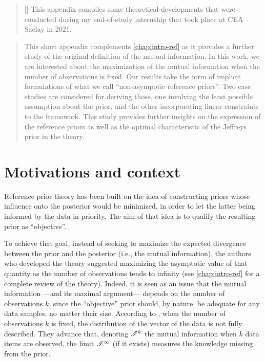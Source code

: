 

\begin{abstract}[\hspace*{-10pt}]
    This appendix compiles some theoretical developments that were conducted during my end-of-study internship that took place at CEA Saclay in 2021. %
\end{abstract}


\begin{abstract}
    This short appendix complements \cref{chap:intro-ref} as it provides a further study of the original definition of the mutual information.
    In this work, we are interested about the maximization of the mutual information when the number of observations is fixed. Our results take 
    the form of implicit formulations of  what we call ``non-asympotic reference priors''. 
    Two case studies are considered for deriving those, 
    one involving the least possible assumption about the prior, and the other incorporating linear constraints to the framework.
    This study provides further insights on the expression of the reference priors as well as the optimal characteristic of the Jeffreys prior in the theory.
\end{abstract}


\minitoc

\section{Motivations and context}

Reference prior theory has been built on the idea of constructing  priors whose influence onto the posterior would be minimized, in order to let the latter being informed by the data in priority.
The aim of that idea is to qualify the resulting prior as ``objective''.

To achieve that goal, 
instead of seeking to maximize the expected divergence between the prior and the posterior (i.e., the mutual information), 
the authors who developed the theory \citep{bernardo_reference_1979,bernardo_bayesian_1994} suggested maximizing the asymptotic value of that quantity as the number of observations tends to infinity (see \cref{chap:intro-ref} for a complete review of the theory).
Indeed, it is seen as an issue that the mutual information ---and its maximal argument--- depends on the number of observations $k$, since the ``objective'' prior should, by nature, be adequate for any data samples, no matter their size.
According to \citet{bernardo_bayesian_1994}, when the number of observations $k$ is fixed, the distribution of the vector of the data is not fully described. They advance that, denoting $\mathscr{I}^k$ the mutual information when $k$ data items are observed, the limit $\mathscr{I}^\infty$ (if it exists) measures the knowledge missing from the prior.



